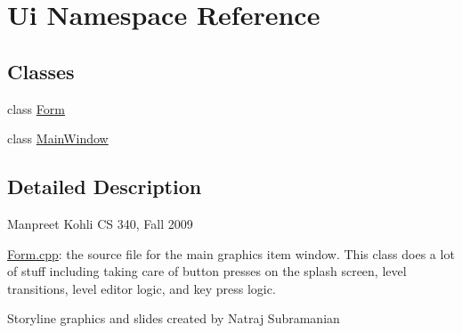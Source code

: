 \hypertarget{namespace_ui}{
\section{Ui Namespace Reference}
\label{namespace_ui}
}
\subsection*{Classes}
\begin{DoxyCompactItemize}
\item 
class \hyperlink{class_ui_1_1_form}{Form}
\item 
class \hyperlink{class_ui_1_1_main_window}{MainWindow}
\end{DoxyCompactItemize}


\subsection{Detailed Description}
Manpreet Kohli CS 340, Fall 2009

\hyperlink{form_8cpp}{Form.cpp}: the source file for the main graphics item window. This class does a lot of stuff including taking care of button presses on the splash screen, level transitions, level editor logic, and key press logic.

Storyline graphics and slides created by Natraj Subramanian 